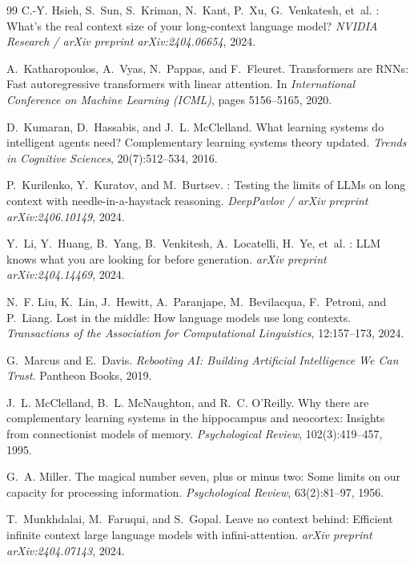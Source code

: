 \documentclass[11pt,a4paper]{article}
\begin{document}
\begin{thebibliography}{99}
C.-Y. Hsieh, S.~Sun, S.~Kriman, N.~Kant, P.~Xu, G.~Venkatesh, et~al.
: What's the real context size of your long-context language model?
\newblock \emph{NVIDIA Research / arXiv preprint arXiv:2404.06654}, 2024.

A.~Katharopoulos, A.~Vyas, N.~Pappas, and F.~Fleuret.
\newblock Transformers are {RNNs}: Fast autoregressive transformers with linear attention.
\newblock In \emph{International Conference on Machine Learning (ICML)}, pages 5156--5165, 2020.

D.~Kumaran, D.~Hassabis, and J.~L. McClelland.
\newblock What learning systems do intelligent agents need? Complementary learning systems theory updated.
\newblock \emph{Trends in Cognitive Sciences}, 20(7):512--534, 2016.

P.~Kurilenko, Y.~Kuratov, and M.~Burtsev.
: Testing the limits of {LLMs} on long context with needle-in-a-haystack reasoning.
\newblock \emph{DeepPavlov / arXiv preprint arXiv:2406.10149}, 2024.

Y.~Li, Y.~Huang, B.~Yang, B.~Venkitesh, A.~Locatelli, H.~Ye, et~al.
: {LLM} knows what you are looking for before generation.
\newblock \emph{arXiv preprint arXiv:2404.14469}, 2024.

N.~F. Liu, K.~Lin, J.~Hewitt, A.~Paranjape, M.~Bevilacqua, F.~Petroni, and P.~Liang.
\newblock Lost in the middle: How language models use long contexts.
\newblock \emph{Transactions of the Association for Computational Linguistics}, 12:157--173, 2024.

G.~Marcus and E.~Davis.
\newblock \emph{Rebooting AI: Building Artificial Intelligence We Can Trust}.
\newblock Pantheon Books, 2019.

J.~L. McClelland, B.~L. McNaughton, and R.~C. O'Reilly.
\newblock Why there are complementary learning systems in the hippocampus and neocortex: Insights from connectionist models of memory.
\newblock \emph{Psychological Review}, 102(3):419--457, 1995.

G.~A. Miller.
\newblock The magical number seven, plus or minus two: Some limits on our capacity for processing information.
\newblock \emph{Psychological Review}, 63(2):81--97, 1956.

T.~Munkhdalai, M.~Faruqui, and S.~Gopal.
\newblock Leave no context behind: Efficient infinite context large language models with infini-attention.
\newblock \emph{arXiv preprint arXiv:2404.07143}, 2024.


\end{thebibliography}
\end{document}
